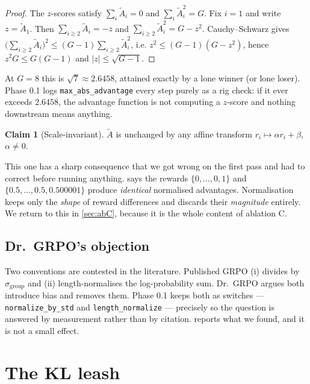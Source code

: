 \documentclass[11pt,letterpaper]{article}
\theoremstyle{definition}
\newtheorem{claim}{Claim}[section]
\newcommand{\Adv}{A}
\begin{document}
\begin{proof}
The $z$-scores satisfy $\sum_i \tilde{\Adv}_i = 0$ and $\sum_i \tilde{\Adv}_i^2 = G$. Fix $i=1$ and
write $z = \tilde{\Adv}_1$. Then $\sum_{i \ge 2} \tilde{\Adv}_i = -z$ and
$\sum_{i\ge2}\tilde{\Adv}_i^2 = G - z^2$. Cauchy--Schwarz gives
$\big(\sum_{i\ge2}\tilde{\Adv}_i\big)^2 \le (G-1)\sum_{i\ge2}\tilde{\Adv}_i^2$, i.e.
$z^2 \le (G-1)(G - z^2)$, hence $z^2 G \le G(G-1)$ and $|z| \le \sqrt{G-1}$.
\end{proof}

At $G = 8$ this is $\sqrt{7} \approx 2.6458$, attained exactly by a lone winner (or lone loser).
Phase 0.1 logs \texttt{max\_abs\_advantage} every step purely as a rig check: if it ever exceeds
$2.6458$, the advantage function is not computing a $z$-score and nothing downstream means anything.

\begin{claim}[Scale-invariant]
\label{claim:scaleinv}
$\tilde{\Adv}$ is unchanged by any affine transform $r_i \mapsto \alpha r_i + \beta$, $\alpha \ne 0$.
\end{claim}

This one has a sharp consequence that we got wrong on the first pass and had to correct before
running anything.  says the rewards $\{0,\dots,0,1\}$ and
$\{0.5,\dots,0.5,0.500001\}$ produce \emph{identical} normalised advantages. Normalisation keeps only
the \emph{shape} of reward differences and discards their \emph{magnitude} entirely. We return to
this in \cref{sec:abC}, because it is the whole content of ablation C.

\subsection{Dr.\ GRPO's objection}

Two conventions are contested in the literature. Published GRPO (i) divides by $\sigma_{\text{group}}$
and (ii) length-normalises the log-probability sum. Dr.\ GRPO argues both introduce bias and removes
them. Phase 0.1 keeps both as switches --- \texttt{normalize\_by\_std} and \texttt{length\_normalize}
--- precisely so the question is answered by measurement rather than by citation. 
reports what we found, and it is not a small effect.

\section{The KL leash}
\label{sec:kl}
\end{document}
